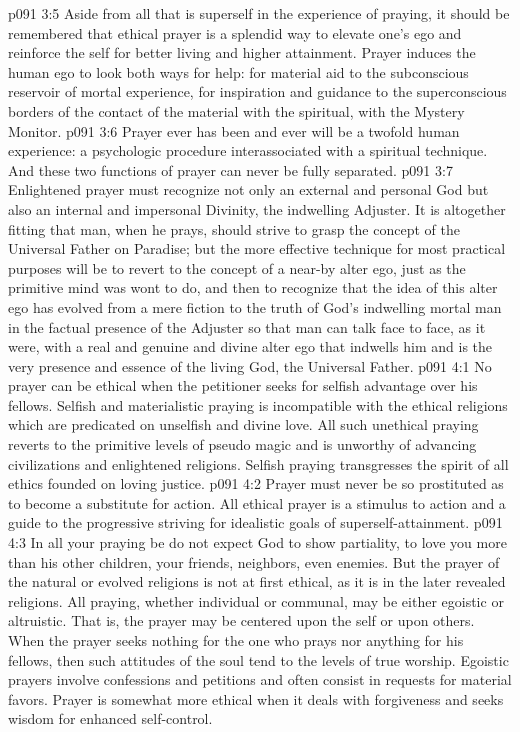 \vs p091 3:5 Aside from all that is superself in the experience of praying, it should be remembered that ethical prayer is a splendid way to elevate one’s ego and reinforce the self for better living and higher attainment. Prayer induces the human ego to look both ways for help: for material aid to the subconscious reservoir of mortal experience, for inspiration and guidance to the superconscious borders of the contact of the material with the spiritual, with the Mystery Monitor.
\vs p091 3:6 Prayer ever has been and ever will be a twofold human experience: a psychologic procedure interassociated with a spiritual technique. And these two functions of prayer can never be fully separated.
\vs p091 3:7 Enlightened prayer must recognize not only an external and personal God but also an internal and impersonal Divinity, the indwelling Adjuster. It is altogether fitting that man, when he prays, should strive to grasp the concept of the Universal Father on Paradise; but the more effective technique for most practical purposes will be to revert to the concept of a near\hyp{}by alter ego, just as the primitive mind was wont to do, and then to recognize that the idea of this alter ego has evolved from a mere fiction to the truth of God’s indwelling mortal man in the factual presence of the Adjuster so that man can talk face to face, as it were, with a real and genuine and divine alter ego that indwells him and is the very presence and essence of the living God, the Universal Father.
\vs p091 4:1 No prayer can be ethical when the petitioner seeks for selfish advantage over his fellows. Selfish and materialistic praying is incompatible with the ethical religions which are predicated on unselfish and divine love. All such unethical praying reverts to the primitive levels of pseudo magic and is unworthy of advancing civilizations and enlightened religions. Selfish praying transgresses the spirit of all ethics founded on loving justice.
\vs p091 4:2 Prayer must never be so prostituted as to become a substitute for action. All ethical prayer is a stimulus to action and a guide to the progressive striving for idealistic goals of superself\hyp{}attainment.
\vs p091 4:3 In all your praying be  do not expect God to show partiality, to love you more than his other children, your friends, neighbors, even enemies. But the prayer of the natural or evolved religions is not at first ethical, as it is in the later revealed religions. All praying, whether individual or communal, may be either egoistic or altruistic. That is, the prayer may be centered upon the self or upon others. When the prayer seeks nothing for the one who prays nor anything for his fellows, then such attitudes of the soul tend to the levels of true worship. Egoistic prayers involve confessions and petitions and often consist in requests for material favors. Prayer is somewhat more ethical when it deals with forgiveness and seeks wisdom for enhanced self\hyp{}control.
